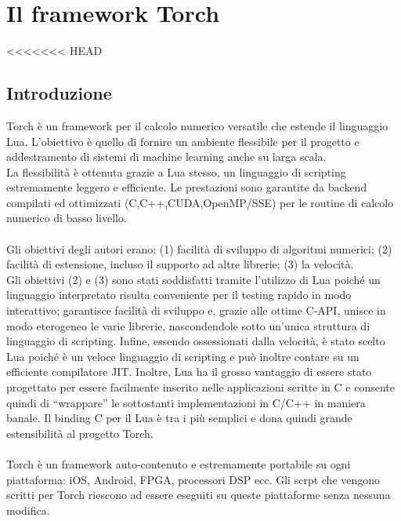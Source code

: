 
\chapter{Il framework Torch} %
\label{AppendixB} %
<<<<<<< HEAD
\def \path {Appendices/}
\section{Introduzione}
Torch\parencite{WTorch} è un framework per il calcolo numerico versatile che estende il linguaggio Lua. L'obiettivo è quello di fornire un ambiente flessibile per il progetto e addestramento di sistemi di machine learning anche su larga scala.\\
La flessibilità è ottenuta grazie a Lua stesso, un linguaggio di scripting estremamente leggero e efficiente. Le prestazioni sono garantite da backend compilati ed ottimizzati (C,C++,CUDA,OpenMP/SSE) per le routine di calcolo numerico di basso livello.
\\
\\
Gli obiettivi degli autori erano: (1) facilità di sviluppo di algoritmi numerici; (2) facilità di
estensione, incluso il supporto ad altre librerie; (3) la velocità.\\
Gli obiettivi (2) e (3) sono stati soddisfatti tramite l'utilizzo di Lua poiché un linguaggio interpretato risulta conveniente per il testing rapido in modo interattivo; garantisce facilità di sviluppo e, grazie alle ottime C-API, unisce in modo eterogeneo le varie librerie,
nascondendole sotto un'unica struttura di linguaggio di scripting.  Infine, essendo ossessionati dalla velocità, è stato scelto Lua poiché è un veloce linguaggio di scripting e può inoltre contare su un efficiente compilatore JIT.
Inoltre, Lua ha il grosso vantaggio di essere stato progettato per essere facilmente inserito nelle applicazioni scritte in C e consente quindi di “wrappare” le sottostanti implementazioni in C/C++ in maniera banale. Il binding C per il Lua è tra i più semplici e dona quindi grande estensibilità al progetto Torch. 
\\
\\
Torch è un framework auto-contenuto e estremamente portabile su ogni piattaforma: iOS, Android, FPGA, processori DSP ecc. Gli scrpt che vengono scritti per Torch riescono ad essere eseguiti su queste piattaforme senza nessuna modifica.
\\
